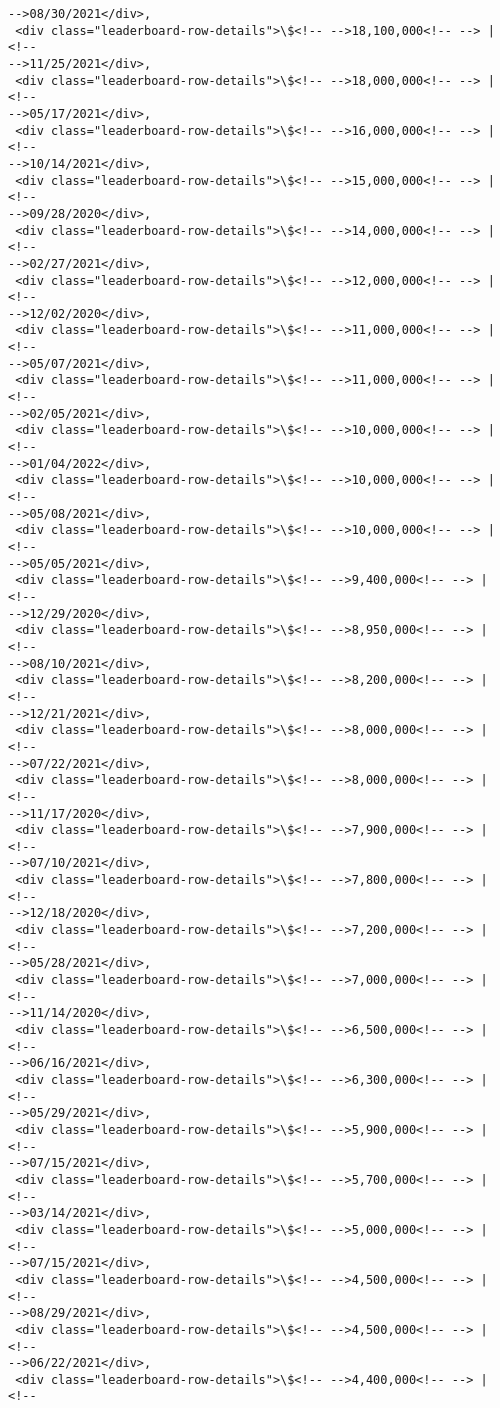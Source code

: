 \documentclass[11pt]{article}
\begin{document}
\begin{tcolorbox}[breakable, size=fbox, boxrule=.5pt, pad at break*=1mm, opacityfill=0]
\begin{Verbatim}[commandchars=\\\{\}]
-->08/30/2021</div>,
 <div class="leaderboard-row-details">\$<!-- -->18,100,000<!-- --> | <!--
-->11/25/2021</div>,
 <div class="leaderboard-row-details">\$<!-- -->18,000,000<!-- --> | <!--
-->05/17/2021</div>,
 <div class="leaderboard-row-details">\$<!-- -->16,000,000<!-- --> | <!--
-->10/14/2021</div>,
 <div class="leaderboard-row-details">\$<!-- -->15,000,000<!-- --> | <!--
-->09/28/2020</div>,
 <div class="leaderboard-row-details">\$<!-- -->14,000,000<!-- --> | <!--
-->02/27/2021</div>,
 <div class="leaderboard-row-details">\$<!-- -->12,000,000<!-- --> | <!--
-->12/02/2020</div>,
 <div class="leaderboard-row-details">\$<!-- -->11,000,000<!-- --> | <!--
-->05/07/2021</div>,
 <div class="leaderboard-row-details">\$<!-- -->11,000,000<!-- --> | <!--
-->02/05/2021</div>,
 <div class="leaderboard-row-details">\$<!-- -->10,000,000<!-- --> | <!--
-->01/04/2022</div>,
 <div class="leaderboard-row-details">\$<!-- -->10,000,000<!-- --> | <!--
-->05/08/2021</div>,
 <div class="leaderboard-row-details">\$<!-- -->10,000,000<!-- --> | <!--
-->05/05/2021</div>,
 <div class="leaderboard-row-details">\$<!-- -->9,400,000<!-- --> | <!--
-->12/29/2020</div>,
 <div class="leaderboard-row-details">\$<!-- -->8,950,000<!-- --> | <!--
-->08/10/2021</div>,
 <div class="leaderboard-row-details">\$<!-- -->8,200,000<!-- --> | <!--
-->12/21/2021</div>,
 <div class="leaderboard-row-details">\$<!-- -->8,000,000<!-- --> | <!--
-->07/22/2021</div>,
 <div class="leaderboard-row-details">\$<!-- -->8,000,000<!-- --> | <!--
-->11/17/2020</div>,
 <div class="leaderboard-row-details">\$<!-- -->7,900,000<!-- --> | <!--
-->07/10/2021</div>,
 <div class="leaderboard-row-details">\$<!-- -->7,800,000<!-- --> | <!--
-->12/18/2020</div>,
 <div class="leaderboard-row-details">\$<!-- -->7,200,000<!-- --> | <!--
-->05/28/2021</div>,
 <div class="leaderboard-row-details">\$<!-- -->7,000,000<!-- --> | <!--
-->11/14/2020</div>,
 <div class="leaderboard-row-details">\$<!-- -->6,500,000<!-- --> | <!--
-->06/16/2021</div>,
 <div class="leaderboard-row-details">\$<!-- -->6,300,000<!-- --> | <!--
-->05/29/2021</div>,
 <div class="leaderboard-row-details">\$<!-- -->5,900,000<!-- --> | <!--
-->07/15/2021</div>,
 <div class="leaderboard-row-details">\$<!-- -->5,700,000<!-- --> | <!--
-->03/14/2021</div>,
 <div class="leaderboard-row-details">\$<!-- -->5,000,000<!-- --> | <!--
-->07/15/2021</div>,
 <div class="leaderboard-row-details">\$<!-- -->4,500,000<!-- --> | <!--
-->08/29/2021</div>,
 <div class="leaderboard-row-details">\$<!-- -->4,500,000<!-- --> | <!--
-->06/22/2021</div>,
 <div class="leaderboard-row-details">\$<!-- -->4,400,000<!-- --> | <!--

\end{Verbatim}
\end{tcolorbox}
\end{document}
